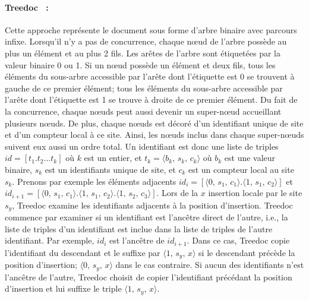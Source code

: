 \paragraph{Treedoc~\cite{letia2009crdts, preguica2009commutative} :} Cette
approche représente le document sous forme d'arbre binaire avec parcours infixe.
Lorsqu'il n'y a pas de concurrence, chaque nœud de l'arbre possède au plus un
élément et au plus 2 fils. Les arêtes de l'arbre sont étiquetées par la valeur
binaire 0 ou 1.  Si un nœud possède un élément et deux fils, tous les éléments
du sous-arbre accessible par l'arête dont l'étiquette est 0 se trouvent à gauche
de ce premier élément; tous les éléments du sous-arbre accessible par l'arête
dont l'étiquette est 1 se trouve à droite de ce premier élément. Du fait de la
concurrence, chaque nœuds peut aussi devenir un super-nœud accueillant plusieurs
nœuds. De plus, chaque nœuds est décoré d'un identifiant unique de site et d'un
compteur local à ce site. Ainsi, les nœuds inclus dans chaque super-nœuds
suivent eux aussi un ordre total. Un identifiant est donc une liste de triples
$id = [t_1.t_2\ldots t_k]$ où $k$ est un entier, et
$t_k = \langle b_k,\, s_k,\, c_k\rangle$ où $b_k$ est une valeur binaire, $s_k$
est un identifiants unique de site, et $c_k$ est un compteur local au site
$s_k$.  Prenons par exemple les éléments adjacents
$id_i=[\langle 0,\,s_1,\,c_1 \rangle.\langle 1,\,s_1,\,c_2 \rangle]$ et
$id_{i+1}=[\langle 0,\,s_1,\,c_1 \rangle.\langle 1,\,s_1,\,c_2 \rangle. \langle 1,\,
s_2,\, c_3 \rangle]$.
Lors de la $x$ insertion locale par le site $s_y$, Treedoc examine les
identifiants adjacents à la position d'insertion. Treedoc commence par examiner
si un identifiant est l'ancêtre direct de l'autre, i.e., la liste de triples
d'un identifiant est inclue dans la liste de triples de l'autre identifiant. Par
exemple, $id_{i}$ est l'ancêtre de $id_{i+1}$. Dans ce cas, Treedoc copie
l'identifiant du descendant et le suffixe par $\langle 1,\, s_y,\, x \rangle$ si
le descendant précède la position d'insertion; $\langle 0,\, s_y,\, x \rangle$
dans le cas contraire. Si aucun des identifiants n'est l'ancêtre de l'autre,
Treedoc choisit de copier l'identifiant précédant la position d'insertion et lui
suffixe le triple $\langle 1,\, s_y,\, x \rangle$.


